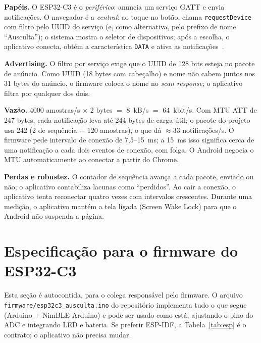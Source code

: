 \documentclass[conference,a4paper]{IEEEtran}
\newcommand{\code}[1]{\texttt{#1}}
\begin{document}
\textbf{Papéis.} O ESP32-C3 é o \emph{periférico}: anuncia um serviço GATT e envia notificações. O navegador é a \emph{central}: ao toque no botão, chama \code{requestDevice} com filtro pelo UUID do serviço (e, como alternativa, pelo prefixo de nome ``Ausculta''); o sistema mostra o seletor de dispositivos; após a escolha, o aplicativo conecta, obtém a característica \code{DATA} e ativa as notificações~\cite{chrome-wb}.

\textbf{Advertising.} O filtro por serviço exige que o UUID de 128 bits esteja no pacote de anúncio. Como UUID (18 bytes com cabeçalho) e nome não cabem juntos nos 31 bytes do anúncio, o firmware coloca o nome no \emph{scan response}; o aplicativo filtra por qualquer dos dois.

\textbf{Vazão.} 4000 amostras/s $\times$ 2 bytes $=$ 8~kB/s $=$ 64~kbit/s. Com MTU ATT de 247 bytes, cada notificação leva até 244 bytes de carga útil; o pacote do projeto usa 242 (2 de sequência + 120 amostras), o que dá $\approx$33 notificações/s. O firmware pede intervalo de conexão de 7,5--15~ms; a 15~ms isso significa cerca de uma notificação a cada dois eventos de conexão, com folga. O Android negocia o MTU automaticamente ao conectar a partir do Chrome.

\textbf{Perdas e robustez.} O contador de sequência avança a cada pacote, enviado ou não; o aplicativo contabiliza lacunas como ``perdidos''. Ao cair a conexão, o aplicativo tenta reconectar quatro vezes com intervalos crescentes. Durante uma medição, o aplicativo mantém a tela ligada (Screen Wake Lock) para que o Android não suspenda a página.

\section{Especificação para o firmware do ESP32-C3}
\label{sec:esp}
Esta seção é autocontida, para o colega responsável pelo firmware. O arquivo \code{firmware/esp32c3\_ausculta.ino} do repositório implementa tudo o que segue (Arduino + NimBLE-Arduino) e pode ser usado como está, ajustando o pino do ADC e integrando LED e bateria. Se preferir ESP-IDF, a Tabela~\ref{tab:esp} é o contrato; o aplicativo não precisa mudar.
\end{document}
